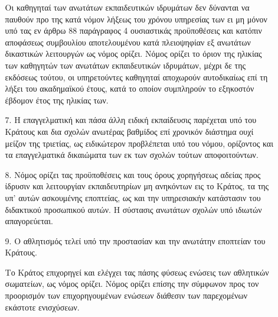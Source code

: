 \documentclass[twoside, a4paper, 10pt]{article}
\begin{document}
\begin{multicols}{2}
\begin{enumerate}
\begin{BigQuote}
\begin{enumerate}
Οι καθηγηταί των ανωτάτων εκπαιδευτικών ιδρυμάτων δεν δύνανται να παυθούν προ της κατά νόμον λήξεως του χρόνου υπηρεσίας των ει μη μόνον υπό τας εν άρθρω 88 παράγραφος 4 ουσιαστικάς προϋποθέσεις και κατόπιν αποφάσεως συμβουλίου αποτελουμένου κατά πλειοψηφίαν εξ ανωτάτων δικαστικών λειτουργών ως νόμος ορίζει.
Νόμος ορίζει το όριον της ηλικίας των καθηγητών των ανωτάτων εκπαιδευτικών ιδρυμάτων, μέχρι δε της εκδόσεως τούτου, οι υπηρετούντες καθηγηταί αποχωρούν αυτοδικαίως επί τη λήξει του ακαδημαϊκού έτους, κατά το οποίον συμπληρούν το εξηκοστόν έβδομον έτος της ηλικίας των.
  \item[7.] Η επαγγελματική και πάσα άλλη ειδική εκπαίδευσις παρέχεται υπό του Κράτους και δια σχολών ανωτέρας βαθμίδος επί χρονικόν διάστημα ουχί μείζον της τριετίας, ως ειδικώτερον προβλέπεται υπό του νόμου, ορίζοντος και τα επαγγελματικά δικαιώματα των εκ των σχολών τούτων αποφοιτούντων.
  \item[8.] Νόμος ορίζει τας προϋποθέσεις και τους όρους χορηγήσεως αδείας προς ίδρυσιν και λειτουργίαν εκπαιδευτηρίων μη ανηκόντων εις το Κράτος, τα της υπ' αυτών ασκουμένης εποπτείας, ως και την υπηρεσιακήν κατάστασιν του διδακτικού προσωπικού αυτών.
Η σύστασις ανωτάτων σχολών υπό ιδιωτών απαγορεύεται.
  \item[9.] Ο αθλητισμός τελεί υπό την προστασίαν και την ανωτάτην εποπτείαν του Κράτους.
  
Το Κράτος επιχορηγεί και ελέγχει τας πάσης φύσεως ενώσεις των αθλητικών σωματείων, ως  νόμος ορίζει. Νόμος ορίζει επίσης την σύμφωνον  προς τον προορισμόν των επιχορηγουμένων ενώσεων διάθεσιν των παρεχομένων εκάστοτε ενισχύσεων.
\end{enumerate}


\end{BigQuote}
\end{enumerate}
\end{multicols}
\end{document}
